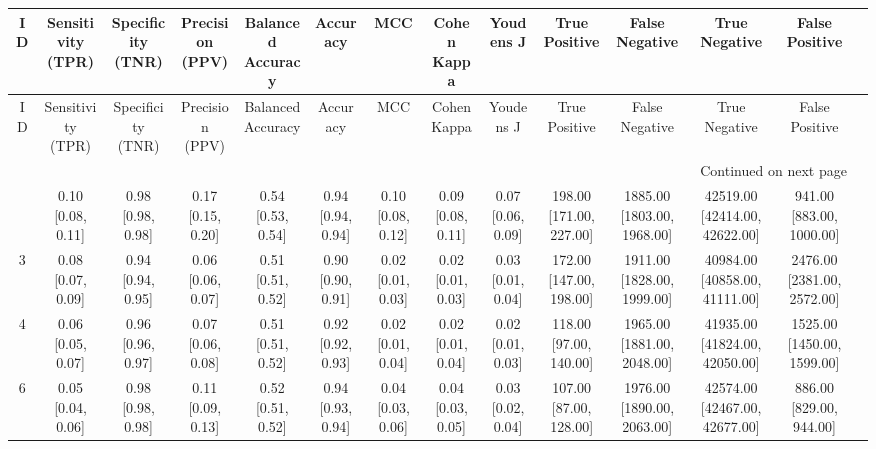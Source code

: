 \documentclass[8pt]{article}
\begin{document}
\begin{center}
\begin{footnotesize}
\begin{longtable}{|cccccccccccccc|}
\toprule
ID & Sensitivity (TPR) & Specificity (TNR) &   Precision (PPV) & Balanced Accuracy &          Accuracy &               MCC &       Cohen Kappa &         Youdens J &           True Positive &             False Negative &                 True Negative &             False Positive \\
\midrule
\endfirsthead

\toprule
ID & Sensitivity (TPR) & Specificity (TNR) &   Precision (PPV) & Balanced Accuracy &          Accuracy &               MCC &       Cohen Kappa &         Youdens J &           True Positive &             False Negative &                 True Negative &             False Positive \\
\midrule
\endhead
\midrule
\multicolumn{13}{r}{{Continued on next page}} \\
\midrule
\endfoot

\bottomrule
\endlastfoot
 9 & 0.10 [0.08, 0.11] & 0.98 [0.98, 0.98] & 0.17 [0.15, 0.20] & 0.54 [0.53, 0.54] & 0.94 [0.94, 0.94] & 0.10 [0.08, 0.12] & 0.09 [0.08, 0.11] & 0.07 [0.06, 0.09] & 198.00 [171.00, 227.00] & 1885.00 [1803.00, 1968.00] & 42519.00 [42414.00, 42622.00] &   941.00 [883.00, 1000.00] \\
 3 & 0.08 [0.07, 0.09] & 0.94 [0.94, 0.95] & 0.06 [0.06, 0.07] & 0.51 [0.51, 0.52] & 0.90 [0.90, 0.91] & 0.02 [0.01, 0.03] & 0.02 [0.01, 0.03] & 0.03 [0.01, 0.04] & 172.00 [147.00, 198.00] & 1911.00 [1828.00, 1999.00] & 40984.00 [40858.00, 41111.00] & 2476.00 [2381.00, 2572.00] \\
 4 & 0.06 [0.05, 0.07] & 0.96 [0.96, 0.97] & 0.07 [0.06, 0.08] & 0.51 [0.51, 0.52] & 0.92 [0.92, 0.93] & 0.02 [0.01, 0.04] & 0.02 [0.01, 0.04] & 0.02 [0.01, 0.03] &  118.00 [97.00, 140.00] & 1965.00 [1881.00, 2048.00] & 41935.00 [41824.00, 42050.00] & 1525.00 [1450.00, 1599.00] \\
 6 & 0.05 [0.04, 0.06] & 0.98 [0.98, 0.98] & 0.11 [0.09, 0.13] & 0.52 [0.51, 0.52] & 0.94 [0.93, 0.94] & 0.04 [0.03, 0.06] & 0.04 [0.03, 0.05] & 0.03 [0.02, 0.04] &  107.00 [87.00, 128.00] & 1976.00 [1890.00, 2063.00] & 42574.00 [42467.00, 42677.00] &    886.00 [829.00, 944.00] \\
\end{longtable}
\end{footnotesize}
\end{center}
\end{document}
